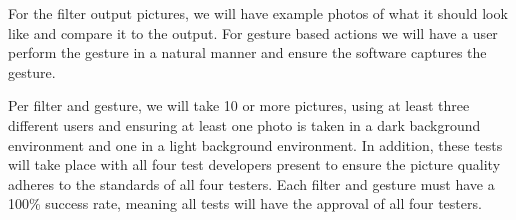 \documentclass[12pt, titlepage]{article}
\begin{document}
For the filter output pictures, we will have example photos of what it should look like and compare it to the output. For gesture based actions we will have a user perform the gesture in a natural manner and ensure the software captures the gesture.

Per filter and gesture, we will take 10 or more pictures, using at least three different users and ensuring at least one photo is taken in a dark background environment and one in a light background environment. In addition, these tests will take place with all four test developers present to ensure the picture quality adheres to the standards of all four testers. Each filter and gesture must have a 100\% success rate, meaning all tests will have the approval of all four testers.




\end{document}
